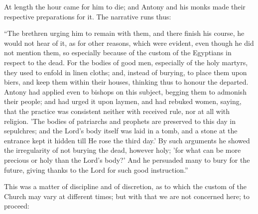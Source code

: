 At length the hour came for him to die; and Antony and his monks
made their respective preparations for it. The narrative runs thus:

``The brethren urging him to remain with them, and there finish
his course, he would not hear of it, as for other reasons, which were
evident, even though he did not mention them, so especially because of
the custom of the Egyptians in respect to the dead. For the bodies of
good men, especially of the holy martyrs, they used to enfold in linen
cloths; and, instead of burying, to place them upon biers, and keep
them within their houses, thinking thus to honour the departed. Antony
had applied even to bishops on this subject, begging them to admonish
their people; and had urged it upon laymen, and had rebuked women,
saying, that the practice was consistent neither with received rule,
nor at all with religion. 'The bodies of patriarchs and prophets are
preserved to this day in sepulchres; and the Lord's body itself was
laid in a tomb, and a stone at the entrance kept it hidden till He
rose the third day.' By such arguments he showed the irregularity of
not burying the dead, however holy; 'for what can be more precious or
holy than the Lord's body?' And he persuaded many to bury for the
future, giving thanks to the Lord for such good instruction.''

This was a matter of discipline and of discretion, as to which the
custom of the Church may vary at different times; but with that we are
not concerned here; to proceed:

